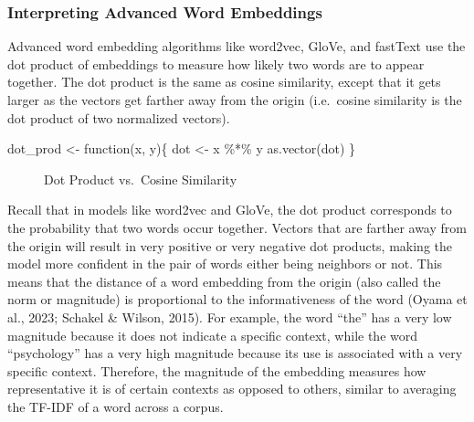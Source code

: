 \documentclass[
  man,
  floatsintext,
  longtable,
  nolmodern,
  notxfonts,
  notimes,
  colorlinks=true,linkcolor=blue,citecolor=blue,urlcolor=blue]{apa7}
\newenvironment{Shaded}{\begin{snugshade}}{\end{snugshade}}
\newcommand{\ControlFlowTok}[1]{\textcolor[rgb]{0.00,0.23,0.31}{#1}}
\newcommand{\FunctionTok}[1]{\textcolor[rgb]{0.28,0.35,0.67}{#1}}
\newcommand{\NormalTok}[1]{\textcolor[rgb]{0.00,0.23,0.31}{#1}}
\newcommand{\OtherTok}[1]{\textcolor[rgb]{0.00,0.23,0.31}{#1}}
\newcommand{\SpecialCharTok}[1]{\textcolor[rgb]{0.37,0.37,0.37}{#1}}
\begin{document}
\subsubsection{Interpreting Advanced Word
Embeddings}\label{sec-embedding-magnitude}

Advanced word embedding algorithms like word2vec, GloVe, and fastText
use the dot product of embeddings to measure how likely two words are to
appear together. The dot product is the same as cosine similarity,
except that it gets larger as the vectors get farther away from the
origin (i.e.~cosine similarity is the dot product of two normalized
vectors).

\begin{Shaded}
\begin{Highlighting}[]
\NormalTok{dot\_prod }\OtherTok{\textless{}{-}} \ControlFlowTok{function}\NormalTok{(x, y)\{}
\NormalTok{  dot }\OtherTok{\textless{}{-}}\NormalTok{ x }\SpecialCharTok{\%*\%}\NormalTok{ y}
  \FunctionTok{as.vector}\NormalTok{(dot)}
\NormalTok{\}}
\end{Highlighting}
\end{Shaded}

\begin{figure}

\caption{\label{fig-dotprod}Dot Product vs.~Cosine Similarity}


\end{figure}%

Recall that in models like word2vec and GloVe, the dot product
corresponds to the probability that two words occur together. Vectors
that are farther away from the origin will result in very positive or
very negative dot products, making the model more confident in the pair
of words either being neighbors or not. This means that the distance of
a word embedding from the origin (also called the norm or magnitude) is
proportional to the informativeness of the word (Oyama et al., 2023;
Schakel \& Wilson, 2015). For example, the word ``the'' has a very low
magnitude because it does not indicate a specific context, while the
word ``psychology'' has a very high magnitude because its use is
associated with a very specific context. Therefore, the magnitude of the
embedding measures how representative it is of certain contexts as
opposed to others, similar to averaging the TF-IDF of a word across a
corpus.
\end{document}
